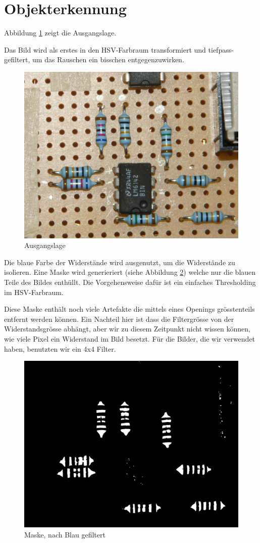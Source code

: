 \section{Objekterkennung}

Abbildung \ref{fig:1} zeigt die Ausgangslage.

Das   Bild   wird   als  erstes  in   den   HSV-Farbraum   transformiert   und
tiefpass-gefiltert,   um   das   Rauschen   ein   bisschen   entgegenzuwirken.

\begin{figure}[H]
    \centering
    \includegraphics[width=.7\linewidth]{images/1}
    \caption{Ausgangslage}
    \label{fig:1}
\end{figure}

Die  blaue  Farbe  der  Widerst\"ande wird ausgenutzt, um die Widerst\"ande zu
isolieren. Eine  Maske  wird generieriert (siehe Abbildung \ref{fig:3}) welche
nur die blauen Teile des Bildes enth\"ullt. Die Vorgehensweise daf\"ur ist ein
einfaches Thresholding im HSV-Farbraum.

Diese  Maske  enth\"alt  noch  viele  Artefakte  die  mittels  eines  Openings
gr\"osstenteils  entfernt  werden  k\"onnen.  Ein Nachteil hier ist  dass  die
Filtergr\"osse  von der Widerstandsgr\"osse  abh\"angt,  aber  wir  zu  diesem
Zeitpunkt  nicht  wissen  k\"onnen,  wie  viele Pixel ein Widerstand  im  Bild
besetzt.  F\"ur  die  Bilder, die wir verwendet haben, benutzten wir  ein  4x4
Filter.

\begin{figure}[H]
    \centering
    \includegraphics[width=.7\linewidth]{images/3}
    \caption{Maske, nach Blau gefiltert}
    \label{fig:3}
\end{figure}

